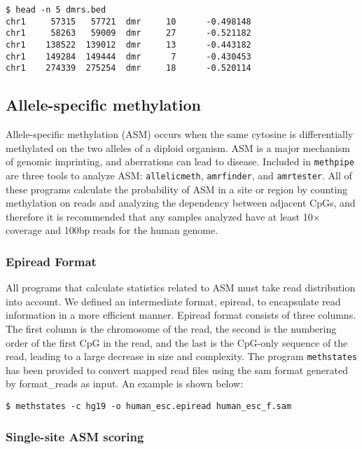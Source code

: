 \documentclass[10pt]{article}
\newcommand{\prog}[1]{\texttt{#1}}
\begin{document}
{\small{%
\begin{verbatim}
$ head -n 5 dmrs.bed
chr1     57315   57721  dmr     10      -0.498148
chr1     58263   59009  dmr     27      -0.521182
chr1    138522  139012  dmr     13      -0.443182
chr1    149284  149444  dmr      7      -0.430453
chr1    274339  275254  dmr     18      -0.520114
\end{verbatim}%

\subsection{Allele-specific methylation}

Allele-specific methylation (ASM) occurs when the same cytosine is
differentially methylated on the two alleles of a diploid organism.
ASM is a major mechanism of genomic imprinting, and aberrations can
lead to disease. Included in \prog{methpipe} are three tools to
analyze ASM: \prog{allelicmeth}, \prog{amrfinder}, and \prog{amrtester}.
All of these programs calculate the probability of ASM in a site or
region by counting methylation on reads and analyzing the dependency
between adjacent CpGs, and therefore it is recommended that any samples
analyzed have at least 10$\times$ coverage and 100bp reads for the human
genome.

\subsubsection{Epiread Format}

All programs that calculate statistics related to ASM must take read
distribution into account. We defined an intermediate format, epiread,
to encapsulate read information in a more efficient manner. Epiread format
consists of three columns. The first column is the chromosome of the read,
the second is the numbering order of the first CpG in the read, and the
last is the CpG-only sequence of the read, leading to a large decrease in
size and complexity. The program \prog{methstates} has been provided to
convert mapped read files using the sam format generated by format\_reads 
as input. An example is shown below:

\begin{verbatim}
$ methstates -c hg19 -o human_esc.epiread human_esc_f.sam
\end{verbatim}


\subsubsection{Single-site ASM scoring}
\label{sec:allelic_scores}

}}
\end{document}
